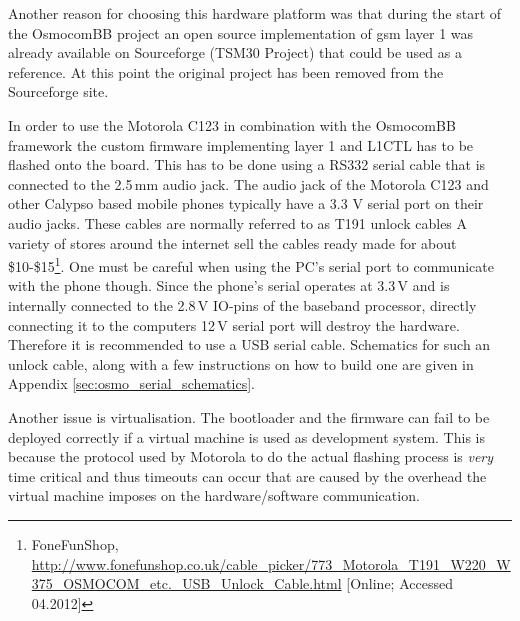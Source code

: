 Another reason for choosing this hardware platform was that during the start of the OsmocomBB project an open source implementation of \gls{gsm} layer 1 was already available on Sourceforge (TSM30 Project) that could be used as a reference. 
At this point the original project has been removed from the Sourceforge site.

In order to use the Motorola C123 in combination with the OsmocomBB framework the custom firmware implementing layer 1 and L1CTL has to be flashed onto the board.
This has to be done using a RS332 serial cable that is connected to the 2.5\,mm audio jack.
The audio jack of the Motorola C123 and other Calypso based mobile phones typically have a 3.3 V serial port on their audio jacks.
These cables are normally referred to as T191 unlock cables 
A variety of stores around the internet sell the cables ready made for about \$10-\$15\footnote{FoneFunShop, \url{http://www.fonefunshop.co.uk/cable_picker/773_Motorola_T191_W220_W375_OSMOCOM_etc._USB_Unlock_Cable.html} [Online; Accessed 04.2012]}.
One must be careful when using the PC's serial port to communicate with the phone though.
Since the phone's serial operates at 3.3\,V and is internally connected to the 2.8\,V IO-pins of the baseband processor, directly connecting it to the computers 12\,V serial port will destroy the hardware.
Therefore it is recommended to use a USB serial cable.
Schematics for such an unlock cable, along with a few instructions on how to build one are given in Appendix \ref{sec:osmo_serial_schematics}.

Another issue is virtualisation.
The bootloader and the firmware can fail to be deployed correctly if a virtual machine is used as development system.
This is because the protocol used by Motorola to do the actual flashing process is \emph{very} time critical and thus timeouts can occur that are caused by the overhead the virtual machine imposes on the hardware/software communication.

